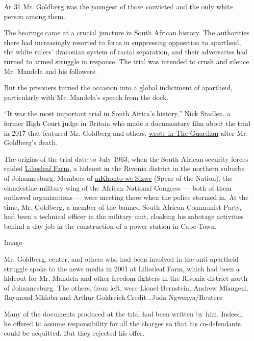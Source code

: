 At 31 Mr. Goldberg was the youngest of those convicted and the only
white person among them.

The hearings came at a crucial juncture in South African history. The
authorities there had increasingly resorted to force in suppressing
opposition to apartheid, the white rulers' draconian system of racial
separation, and their adversaries had turned to armed struggle in
response. The trial was intended to crush and silence Mr. Mandela and
his followers.

But the prisoners turned the occasion into a global indictment of
apartheid, particularly with Mr. Mandela's speech from the dock.

``It was the most important trial in South Africa's history,'' Nick
Stadlen, a former High Court judge in Britain who made a documentary
film about the trial in 2017 that featured Mr. Goldberg and others,
\href{https://www.theguardian.com/commentisfree/2020/may/03/denis-goldberg-the-man-who-offered-to-sign-his-own-death-warrant-to-save-nelson-mandela}{wrote
in The Guardian} after Mr. Goldberg's death.

The origins of the trial date to July 1963, when the South African
security forces raided \href{http://www.liliesleaf.co.za/}{Liliesleaf
Farm}, a hideout in the Rivonia district in the northern suburbs of
Johannesburg. Members of
\href{https://www.sahistory.org.za/article/umkhonto-wesizwe-mk}{mKhonto
we Sizwe} (Spear of the Nation), the clandestine military wing of the
African National Congress --- both of them outlawed organizations ---
were meeting there when the police stormed in. At the time, Mr.
Goldberg, a member of the banned South African Communist Party, had been
a technical officer in the military unit, cloaking his sabotage
activities behind a day job in the construction of a power station in
Cape Town.

Image

Mr. Goldberg, center, and others who had been involved in the
anti-apartheid struggle spoke to the news media in 2001 at Liliesleaf
Farm, which had been a hideout for Mr. Mandela and other freedom
fighters in the Rivonia district north of Johannesburg. The others, from
left, were Lionel Bernstein, Andrew Mlangeni, Raymond Mhlaba and Arthur
Goldreich.Credit...Juda Ngwenya/Reuters

Many of the documents produced at the trial had been written by him.
Indeed, he offered to assume responsibility for all the charges so that
his co-defendants could be acquitted. But they rejected his offer.

